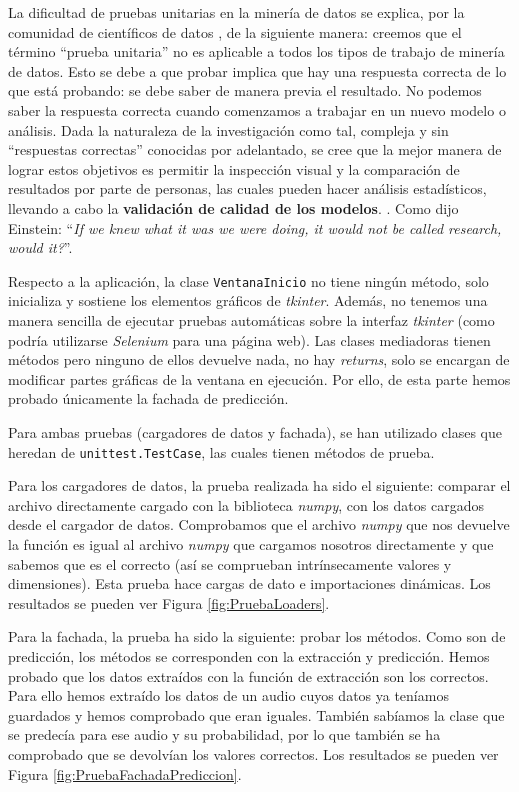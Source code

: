 La dificultad de pruebas unitarias en la minería de datos se explica, por la comunidad de científicos de datos , de la siguiente manera: creemos que el término ``prueba unitaria'' no es aplicable a todos los tipos de trabajo de minería de datos. Esto se debe a que probar implica que hay una respuesta correcta de lo que está probando: se debe saber de manera previa el resultado. No podemos saber la respuesta correcta cuando comenzamos a trabajar en un nuevo modelo o análisis. Dada la naturaleza de la investigación como tal, compleja y sin ``respuestas correctas'' conocidas por adelantado, se cree que la mejor manera de lograr estos objetivos es permitir la inspección visual y la comparación de resultados por parte de personas, las cuales pueden hacer análisis estadísticos, llevando a cabo la \textbf{validación de calidad de los modelos}. \cite{pruebasdominio}. Como dijo Einstein: ``\textit{If we knew what it was we were doing, it would not be called research, would it?}''.

Respecto a la aplicación, la clase \texttt{VentanaInicio} no tiene ningún método, solo inicializa y sostiene los elementos gráficos de \textit{tkinter}. Además, no tenemos una manera sencilla de ejecutar pruebas automáticas sobre la interfaz \textit{tkinter} (como podría utilizarse \textit{Selenium} para una página web). Las clases mediadoras tienen métodos pero ninguno de ellos devuelve nada, no hay \textit{returns}, solo se encargan de modificar partes gráficas de la ventana en ejecución. Por ello, de esta parte hemos probado únicamente la fachada de predicción.

Para ambas pruebas (cargadores de datos y fachada), se han utilizado clases que heredan de \texttt{unittest.TestCase}, las cuales tienen métodos de prueba.

Para los cargadores de datos, la prueba realizada ha sido el siguiente: comparar el archivo directamente cargado con la biblioteca \textit{numpy}, con los datos cargados desde el cargador de datos. Comprobamos que el archivo \textit{numpy} que nos devuelve la función es igual al archivo \textit{numpy} que cargamos nosotros directamente y que sabemos que es el correcto (así se comprueban intrínsecamente valores y dimensiones). Esta prueba hace cargas de dato e importaciones dinámicas. Los resultados se pueden ver Figura \ref{fig:PruebaLoaders}.

Para la fachada, la prueba ha sido la siguiente: probar los métodos. Como son de predicción, los  métodos se corresponden con la extracción y predicción. Hemos probado que los datos extraídos con la función de extracción son los correctos. Para ello hemos extraído los datos de un audio cuyos datos ya teníamos guardados y hemos comprobado que eran iguales. También sabíamos la clase que se predecía para ese audio y su probabilidad, por lo que también se ha comprobado que se devolvían los valores correctos. Los resultados se pueden ver Figura \ref{fig:PruebaFachadaPrediccion}.

